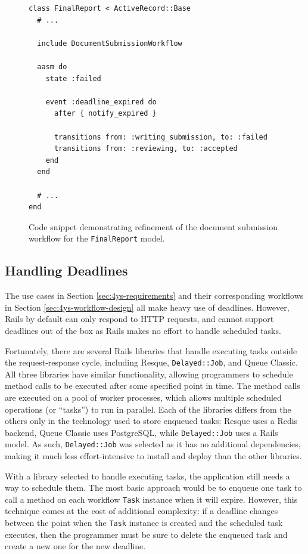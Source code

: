 \documentclass[document.tex]{subfiles}
\begin{document}
\begin{figure}[!ht]
  \begin{lstlisting}
class FinalReport < ActiveRecord::Base
  # ...

  include DocumentSubmissionWorkflow

  aasm do
    state :failed

    event :deadline_expired do
      after { notify_expired }

      transitions from: :writing_submission, to: :failed
      transitions from: :reviewing, to: :accepted
    end
  end

  # ...
end
  \end{lstlisting}
  \cprotect\caption{Code snippet demonstrating refinement of the document submission workflow for the \verb!FinalReport! model.}
  \label{fig:final-report-workflow-specialization}
\end{figure}


\FloatBarrier


\subsection{Handling Deadlines}
\label {sec:4ys-handling-deadlines}

The use cases in Section \ref{sec:4ys-requirements} and their corresponding
workflows in Section \ref{sec:4ys-workflow-design} all make heavy use of deadlines. However, Rails by default can only respond to HTTP requests, and cannot support deadlines out of the box as Rails makes no effort to handle scheduled tasks.

Fortunately, there are several Rails libraries that handle executing tasks outside the request-response cycle, including Resque, \verb!Delayed::Job!, and Queue Classic. All three libraries have similar functionality, allowing programmers to schedule method calls to be executed after some specified point in time. The method calls are executed on a pool of worker processes, which allows multiple scheduled operations (or ``tasks'') to run in parallel. Each of the libraries differs from the others only in the technology used to store enqueued tasks: Resque uses a Redis backend, Queue Classic uses PostgreSQL, while \verb!Delayed::Job! uses a Rails model. As such, \verb!Delayed::Job! was selected as it has no additional dependencies, making it much less effort-intensive to install and deploy than the other libraries.

With a library selected to handle executing tasks, the application still needs a way to schedule them. The most basic approach would be to enqueue one task to call a method on each workflow \verb!Task! instance when it will expire. However, this technique comes at the cost of additional complexity: if a deadline changes between the point when the \verb!Task! instance is created and the scheduled task executes, then the programmer must be sure to delete the enqueued task and create a new one for the new deadline.
\end{document}
